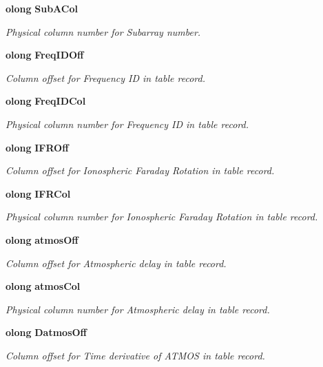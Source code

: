 \begin{CompactItemize}
{\bf olong} {\bf Sub\-ACol}
\begin{CompactList}\small\item\em Physical column number for Subarray number. \item\end{CompactList}\item 
{\bf olong} {\bf Freq\-IDOff}
\begin{CompactList}\small\item\em Column offset for Frequency ID in table record. \item\end{CompactList}\item 
{\bf olong} {\bf Freq\-IDCol}
\begin{CompactList}\small\item\em Physical column number for Frequency ID in table record. \item\end{CompactList}\item 
{\bf olong} {\bf IFROff}
\begin{CompactList}\small\item\em Column offset for Ionospheric Faraday Rotation in table record. \item\end{CompactList}\item 
{\bf olong} {\bf IFRCol}
\begin{CompactList}\small\item\em Physical column number for Ionospheric Faraday Rotation in table record. \item\end{CompactList}\item 
{\bf olong} {\bf atmos\-Off}
\begin{CompactList}\small\item\em Column offset for Atmospheric delay in table record. \item\end{CompactList}\item 
{\bf olong} {\bf atmos\-Col}
\begin{CompactList}\small\item\em Physical column number for Atmospheric delay in table record. \item\end{CompactList}\item 
{\bf olong} {\bf Datmos\-Off}
\begin{CompactList}\small\item\em Column offset for Time derivative of ATMOS in table record. \item\end{CompactList}\item 

\end{CompactItemize}
